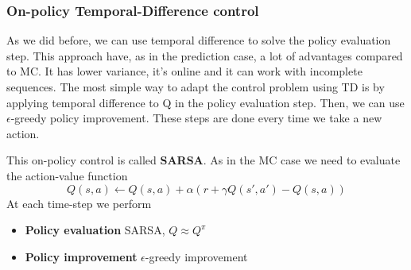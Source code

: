 \documentclass[main.tex]{subfiles}
\begin{document}
\subsubsection{On-policy Temporal-Difference control}
As we did before, we can use temporal difference to solve the policy evaluation step. This approach have, as in the prediction case, a lot of advantages compared to MC. It has lower variance, it's online and it can work with incomplete sequences.
The most simple way to adapt the control problem using TD is by applying temporal difference to Q in the policy evaluation step. Then, we can use $\epsilon$-greedy policy improvement. These steps are done every time we take a new action.
\par \noindent
This on-policy control is called \textbf{SARSA}\footnotemark. As in the MC case we need to evaluate the action-value function
\begin{equation*}
    Q(s,a) \leftarrow Q(s,a) + \alpha(r + \gamma Q(s',a') - Q(s,a))
\end{equation*}
At each time-step we perform
\begin{itemize}
    \item \textbf{Policy evaluation} SARSA, $Q \approx Q^{\pi}$
    \item \textbf{Policy improvement} $\epsilon$-greedy improvement
\end{itemize}
\end{document}
